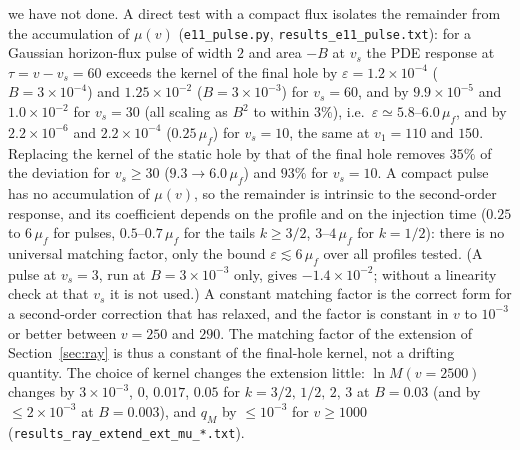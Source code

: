 \documentclass[11pt]{article}
\begin{document}
we have not done. A direct test with a compact flux isolates the remainder from the accumulation of $\mu(v)$ (\texttt{e11\_pulse.py}, \texttt{results\_e11\_pulse.txt}): for a Gaussian horizon-flux pulse of width $2$ and area $-B$ at $v_s$ the PDE response at $\tau=v-v_s=60$ exceeds the kernel of the final hole by $\varepsilon=1.2\times10^{-4}$ ($B=3\times10^{-4}$) and $1.25\times10^{-2}$ ($B=3\times10^{-3}$) for $v_s=60$, and by $9.9\times10^{-5}$ and $1.0\times10^{-2}$ for $v_s=30$ (all scaling as $B^2$ to within $3\%$), i.e.\ $\varepsilon\simeq5.8$--$6.0\,\mu_f$, and by $2.2\times10^{-6}$ and $2.2\times10^{-4}$ ($0.25\,\mu_f$) for $v_s=10$, the same at $v_1=110$ and $150$. Replacing the kernel of the static hole by that of the final hole removes $35\%$ of the deviation for $v_s\ge30$ ($9.3\to6.0\,\mu_f$) and $93\%$ for $v_s=10$. A compact pulse has no accumulation of $\mu(v)$, so the remainder is intrinsic to the second-order response, and its coefficient depends on the profile and on the injection time ($0.25$ to $6\,\mu_f$ for pulses, $0.5$--$0.7\,\mu_f$ for the tails $k\ge3/2$, $3$--$4\,\mu_f$ for $k=1/2$): there is no universal matching factor, only the bound $\varepsilon\lesssim6\,\mu_f$ over all profiles tested. (A pulse at $v_s=3$, run at $B=3\times10^{-3}$ only, gives $-1.4\times10^{-2}$; without a linearity check at that $v_s$ it is not used.) A constant matching factor is the correct form for a second-order correction that has relaxed, and the factor is constant in $v$ to $10^{-3}$ or better between $v=250$ and $290$. The matching factor of the extension of Section~\ref{sec:ray} is thus a constant of the final-hole kernel, not a drifting quantity. The choice of kernel changes the extension little: $\ln M(v=2500)$ changes by $3\times10^{-3}$, $0$, $0.017$, $0.05$ for $k=3/2,\,1/2,\,2,\,3$ at $B=0.03$ (and by $\le2\times10^{-3}$ at $B=0.003$), and $q_M$ by $\le10^{-3}$ for $v\ge1000$ (\texttt{results\_ray\_extend\_ext\_mu\_*.txt}).
\end{document}
